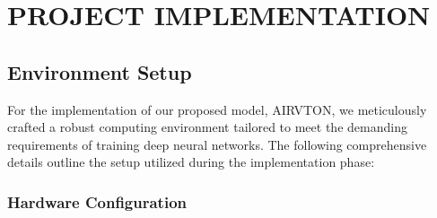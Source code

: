 \chapter[Project Implementation]{PROJECT IMPLEMENTATION}

\section{Environment Setup}

For the implementation of our proposed model, AIRVTON, we meticulously crafted a robust computing environment tailored to meet the demanding requirements of training deep neural networks. The following comprehensive details outline the setup utilized during the implementation phase:

\subsection{Hardware Configuration}

